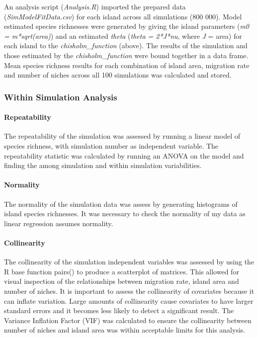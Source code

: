 \documentclass{article}
\begin{document}
\noindent An analysis script (\textit{Analysis.R}) imported the prepared data (\textit{SimModelFitData.csv}) for each island across all simulations (800 000). Model estimated species richnesses were generated by giving the island parameters (\textit{m0 = m*sqrt(area)}) and an estimated \textit{theta} (\textit{theta = 2*J*nu}, where \textit{J} = area) for each island to the \textit{chisholm\_function} (above). The results of the simulation and those estimated by the \textit{chisholm\_function} were bound together in a data frame. Mean species richness results for each combination of island area, migration rate and number of niches across all 100 simulations was calculated and stored.
  
\subsubsection{Within Simulation Analysis}

\paragraph {Repeatability} 
The repeatability of the simulation was assessed by running a linear model of species richness, with simulation number as independent variable. The repeatability statistic was calculated by running an ANOVA on the model and finding the among simulation and within simulation variabilities.

\paragraph{Normality}
The normality of the simulation data was assess by generating histograms of island species richnesses. It was necessary to check the normality of my data as linear regression assumes normality.

\paragraph{Collinearity}
The collinearity of the simulation independent variables was assessed by using the R base function pairs() to produce a scatterplot of matrices. This allowed for visual inspection of the relationships between migration rate, island area and number of niches. It is important to assess the collinearity of covariates because it can inflate variation. Large amounts of collinearity cause covariates to have larger standard errors and it becomes less likely to detect a significant result. The Variance Inflation Factor (VIF) was calculated to ensure the collinearity between number of niches and island area was within acceptable limits for this analysis. 
\end{document}
